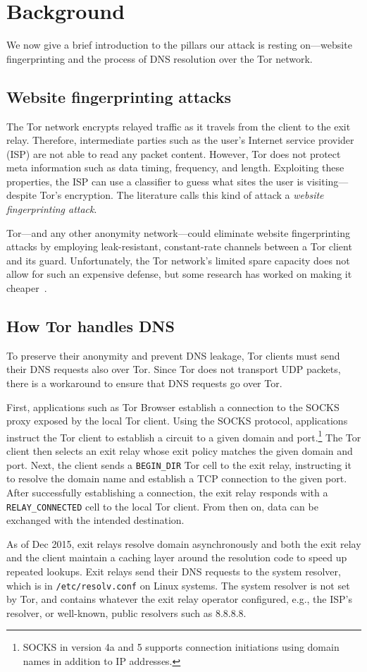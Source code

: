 \section{Background}
\label{sec:background}
We now give a brief introduction to the pillars our attack is resting
on---website fingerprinting and the process of DNS resolution over the Tor
network.

\subsection{Website fingerprinting attacks}
The Tor network encrypts relayed traffic as it travels from the client to the
exit relay.  Therefore, intermediate parties such as the user's Internet service
provider (ISP) are not able to read any packet content.  However, Tor does not
protect meta information such as data timing, frequency, and length.  Exploiting
these properties, the ISP can use a classifier to guess what sites the user is
visiting---despite Tor's encryption.  The literature calls this kind of attack a
\emph{website fingerprinting attack}.

Tor---and any other anonymity network---could eliminate website fingerprinting
attacks by employing leak-resistant, constant-rate channels between a Tor client
and its guard.  Unfortunately, the Tor network's limited spare capacity does not
allow for such an expensive defense, but some research has worked on making it
cheaper~\cite{Cai2014a}.

\subsection{How Tor handles DNS}
To preserve their anonymity and prevent DNS leakage, Tor clients must send their
DNS requests also over Tor.  Since Tor does not transport UDP packets, there is
a workaround to ensure that DNS requests go over Tor.

First, applications such as Tor Browser establish a connection to the SOCKS
proxy exposed by the local Tor client.  Using the SOCKS protocol, applications
instruct the Tor client to establish a circuit to a given domain and
port.\footnote{SOCKS in version 4a and 5 supports connection initiations using
domain names in addition to IP addresses.} The Tor client then selects an exit
relay whose exit policy matches the given domain and port.  Next, the client
sends a \texttt{BEGIN\_DIR} Tor cell to the exit relay, instructing it to
resolve the domain name and establish a TCP connection to the given port.  After
successfully establishing a connection, the exit relay responds with a
\texttt{RELAY\_CONNECTED} cell to the local Tor client.  From then on, data can
be exchanged with the intended destination.

As of Dec 2015, exit relays resolve domain asynchronously and both the exit
relay and the client maintain a caching layer around the resolution code to
speed up repeated lookups.  Exit relays send their DNS requests to the system
resolver, which is in \texttt{/etc/resolv.conf} on Linux systems.  The system
resolver is not set by Tor, and contains whatever the exit relay operator
configured, e.g., the ISP's resolver, or well-known, public resolvers such as
8.8.8.8.
